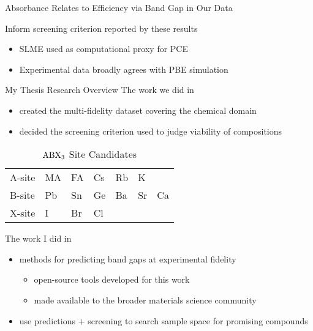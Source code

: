 \documentclass[10pt, aspectratio=169, presentation]{beamer}
\begin{document}
\begin{frame}[label={sec:orgc0e6297}]{Absorbance Relates to Efficiency via Band Gap in Our Data}
 
\begin{center}

\end{center}

Inform screening criterion reported by these results\autocite{yang-2023-high-throug} 
\begin{itemize}
\item SLME used as computational proxy for PCE
\item Experimental data\autocite{almora-2020-devic-perfor} broadly agrees with PBE simulation
\end{itemize}
\end{frame}

\begin{frame}[label={sec:org2a430f1}]{My Thesis Research Overview}
The work we did in \autocite{yang-2023-high-throug}
\begin{itemize}
\item created the multi-fidelity dataset covering the chemical domain
\item decided the screening criterion used to judge viability of compositions
\end{itemize}

\begin{table}[htbp]
\caption{\(\ce{ABX3}\) Site Candidates}
\centering
\begin{tabular}{l|llllll}
A-site & MA & FA & Cs & Rb & K & \\[0pt]
B-site & Pb & Sn & Ge & Ba & Sr & Ca\\[0pt]
X-site & I & Br & Cl &  &  & \\[0pt]
\end{tabular}
\end{table}

The work I did in \autocite{manganaris-2023-multi-fidel}
\begin{itemize}
\item methods for predicting band gaps at experimental fidelity
\begin{itemize}
\item open-source tools developed for this work
\item made available to the broader materials science community
\end{itemize}
\item use predictions + screening to search sample space for promising compounds
\end{itemize}
\end{frame}
\end{document}
